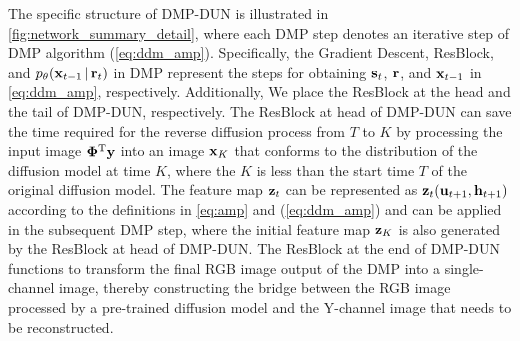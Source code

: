 \documentclass[10pt,twocolumn,letterpaper]{article}
\begin{document}
The specific structure of DMP-DUN is illustrated in \cref{fig:network_summary_detail}, where each DMP step denotes an iterative step of DMP algorithm (\ie \cref{eq:ddm_amp}). Specifically, the Gradient Descent, ResBlock, and $p_\theta(\operatorname{\mathbf{x}}_{t-1}|\operatorname{\mathbf{r}}_t)$ in DMP represent the steps for obtaining $\operatorname{\mathbf{s}}_t$, $\operatorname{\mathbf{r}}$, and $\operatorname{\mathbf{x}}_{t-1}$ in \cref{eq:ddm_amp}, respectively. Additionally, We place the ResBlock at the head and the tail of DMP-DUN, respectively. The ResBlock at head of DMP-DUN can save the time required for the reverse diffusion process from $T$ to $K$ by processing the input image $\operatorname{\mathbf{\Phi}^T \mathbf{y}}$ into an image $\operatorname{\mathbf{x}}_K$ that conforms to the distribution of the diffusion model at time $K$, where the $K$ is less than the start time $T$ of the original diffusion model. The feature map $\operatorname{\mathbf{z}}_t$ can be represented as $\operatorname{\mathbf{z}}_t (\operatorname{\mathbf{u}}_{t+1}, \operatorname{\mathbf{h}}_{t+1})$ according to the definitions in \cref{eq:amp} and (\ref{eq:ddm_amp}) and can be applied in the subsequent DMP step, where the initial feature map $\operatorname{\mathbf{z}}_K$ is also generated by the ResBlock at head of DMP-DUN. The ResBlock at the end of DMP-DUN functions to transform the final RGB image output of the DMP into a single-channel image, thereby constructing the bridge between the RGB image processed by a pre-trained diffusion model and the Y-channel image that needs to be reconstructed.
\end{document}
